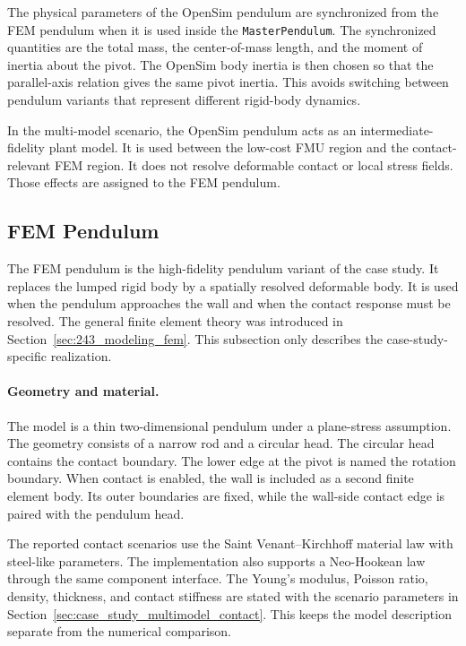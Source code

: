 The physical parameters of the OpenSim pendulum are synchronized from the \ac{FEM} pendulum when it is used inside the \texttt{MasterPendulum}.
The synchronized quantities are the total mass, the center-of-mass length, and the moment of inertia about the pivot.
The OpenSim body inertia is then chosen so that the parallel-axis relation gives the same pivot inertia.
This avoids switching between pendulum variants that represent different rigid-body dynamics.

In the multi-model scenario, the OpenSim pendulum acts as an intermediate-fidelity plant model.
It is used between the low-cost \ac{FMU} region and the contact-relevant \ac{FEM} region.
It does not resolve deformable contact or local stress fields.
Those effects are assigned to the \ac{FEM} pendulum.

\subsection{FEM Pendulum}
\label{sec:case_study_pendulum_fem}

The \ac{FEM} pendulum is the high-fidelity pendulum variant of the case study.
It replaces the lumped rigid body by a spatially resolved deformable body.
It is used when the pendulum approaches the wall and when the contact response must be resolved.
The general finite element theory was introduced in Section~\ref{sec:243_modeling_fem}.
This subsection only describes the case-study-specific realization.

\paragraph{Geometry and material.}
The model is a thin two-dimensional pendulum under a plane-stress assumption.
The geometry consists of a narrow rod and a circular head.
The circular head contains the contact boundary.
The lower edge at the pivot is named the rotation boundary.
When contact is enabled, the wall is included as a second finite element body.
Its outer boundaries are fixed, while the wall-side contact edge is paired with the pendulum head.

The reported contact scenarios use the Saint Venant--Kirchhoff material law with steel-like parameters.
The implementation also supports a Neo-Hookean law through the same component interface.
The Young's modulus, Poisson ratio, density, thickness, and contact stiffness are stated with the scenario parameters in Section~\ref{sec:case_study_multimodel_contact}.
This keeps the model description separate from the numerical comparison.

